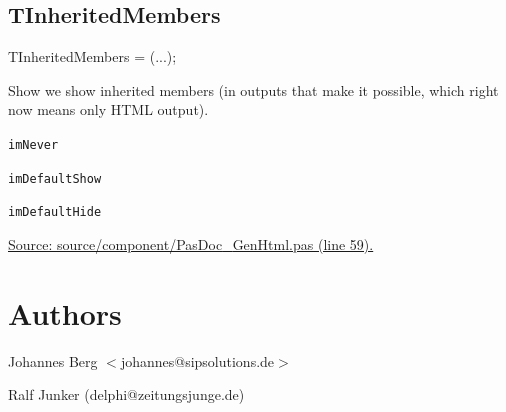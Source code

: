 \documentclass{report}
\newif\ifpdf
\begin{document}
\subsection*{TInheritedMembers}
\fi
\label{PasDoc_GenHtml-TInheritedMembers}
\begin{list}{}{
\setlength{\itemindent}{0cm}
\setlength{\listparindent}{0cm}
\setlength{\leftmargin}{\evensidemargin}
\addtolength{\leftmargin}{\tmplength}
\settowidth{\labelsep}{X}
\addtolength{\leftmargin}{\labelsep}
\setlength{\labelwidth}{\tmplength}
}
\item[\textbf{Declaration}\hfill]
\ifpdf
\begin{flushleft}
\fi
\begin{ttfamily}
TInheritedMembers = (...);\end{ttfamily}

\ifpdf
\end{flushleft}
\fi

\par
\item[\textbf{Description}]
Show we show inherited members (in outputs that make it possible, which right now means only HTML output).\item[\textbf{Values}]
\begin{description}
\item[\texttt{imNever}] \label{PasDoc_GenHtml-imNever}
\index{}
 
\item[\texttt{imDefaultShow}] \label{PasDoc_GenHtml-imDefaultShow}
\index{}
 
\item[\texttt{imDefaultHide}] \label{PasDoc_GenHtml-imDefaultHide}
\index{}
 
\end{description}
\par
\href{https://github.com/pasdoc/pasdoc/blob/master/source/component/PasDoc_GenHtml.pas#L59}{Source: source/component/PasDoc{\_}GenHtml.pas (line 59).}

\end{list}
\section{Authors}
\par
Johannes Berg {$<$}johannes@sipsolutions.de{$>$}

\par
Ralf Junker (delphi@zeitungsjunge.de)
\end{document}
